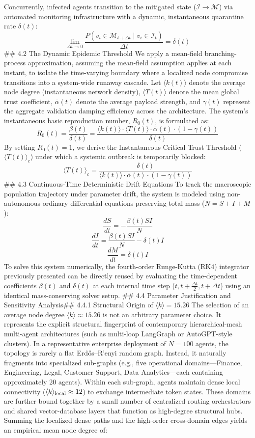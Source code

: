 Concurrently, infected agents transition to the mitigated state ($\mathcal{I} \to \mathcal{M}$) via automated monitoring infrastructure with a dynamic, instantaneous quarantine rate $\delta(t)$:
$$\lim_{\Delta t \to 0} \frac{P(v_i \in \mathcal{M}_{t+\Delta t} \mid v_i \in \mathcal{I}_t)}{\Delta t} = \delta(t)$$ 
## 4.2 The Dynamic Epidemic Threshold
We apply a mean-field branching-process approximation, assuming the mean-field assumption applies at each instant, to isolate the time-varying boundary where a localized node compromise transitions into a system-wide runaway cascade. Let $\langle k(t) \rangle$ denote the average node degree (instantaneous network density), $\langle T(t) \rangle$ denote the mean global trust coefficient, $\bar{\alpha}(t)$ denote the average payload strength, and $\gamma(t)$ represent the aggregate validation damping efficiency across the architecture.
The system's instantaneous basic reproduction number, $R_0(t)$, is formulated as:
$$R_0(t) = \frac{\beta(t)}{\delta(t)} = \frac{\langle k(t) \rangle \cdot \langle T(t) \rangle \cdot \bar{\alpha}(t) \cdot (1 - \gamma(t))}{\delta(t)}$$ 
By setting $R_0(t) = 1$, we derive the Instantaneous Critical Trust Threshold ($\langle T(t) \rangle_c$) under which a systemic outbreak is temporarily blocked:
$$\langle T(t) \rangle_c = \frac{\delta(t)}{\langle k(t) \rangle \cdot \bar{\alpha}(t) \cdot (1 - \gamma(t))}$$ 
## 4.3 Continuous-Time Deterministic Drift Equations
To track the macroscopic population trajectory under parameter drift, the system is modeled using non-autonomous ordinary differential equations preserving total mass ($N = S + I + M$):
$$\frac{dS}{dt} = -\frac{\beta(t) S I}{N}$$ 
$$\frac{dI}{dt} = \frac{\beta(t) S I}{N} - \delta(t) I$$ 
$$\frac{dM}{dt} = \delta(t) I$$ 
To solve this system numerically, the fourth-order Runge-Kutta ($\text{RK}4$) integrator previously presented can be directly reused by evaluating the time-dependent coefficients $\beta(t)$ and $\delta(t)$ at each internal time step ($t, t + \frac{\Delta t}{2}, t + \Delta t$) using an identical mass-conserving solver setup.
## 4.4 Parameter Justification and Sensitivity Analysis## 4.4.1 Structural Origin of $\langle k \rangle = 15.26$
The selection of an average node degree $\langle k \rangle \approx 15.26$ is not an arbitrary parameter choice. It represents the explicit structural fingerprint of contemporary hierarchical-mesh multi-agent architectures (such as multi-loop LangGraph or AutoGPT-style clusters).
In a representative enterprise deployment of $N = 100$ agents, the topology is rarely a flat Erd\H{o}s–R'{e}nyi random graph. Instead, it naturally fragments into specialized sub-graphs (e.g., five operational domains—Finance, Engineering, Legal, Customer Support, Data Analytics—each containing approximately 20 agents). Within each sub-graph, agents maintain dense local connectivity ($\langle k \rangle_{\rm local} \approx 12$) to exchange intermediate token states. These domains are further bound together by a small number of centralized routing orchestrators and shared vector-database layers that function as high-degree structural hubs. Summing the localized dense paths and the high-order cross-domain edges yields an empirical mean node degree of:
